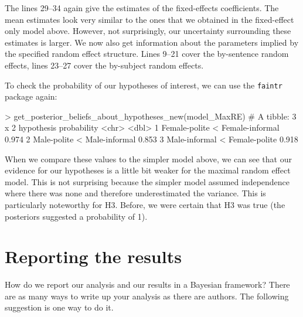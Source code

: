 \documentclass[nobib]{tufte-handout}
\begin{document}
The lines 29--34 again give the estimates of the fixed-effects coefficients. The mean estimates look very similar to the ones that we obtained in the fixed-effect only model above. However, not surprisingly, our uncertainty surrounding these estimates is larger.  
We now also get information about the parameters implied by the specified random effect
structure. Lines 9--21 cover the by-sentence random effects, lines 23--27 cover the by-subject
random effects.

To check the probability of our hypotheses of interest, we can use the \texttt{faintr} package again:

\medskip

\begin{minipage}[]{\textwidth}
\begin{rc}
> get_posterior_beliefs_about_hypotheses_new(model_MaxRE)
# A tibble: 3 x 2
  hypothesis                      probability
  <chr>                                 <dbl>
1 Female-polite < Female-informal       0.974
2 Male-polite < Male-informal           0.853
3 Male-informal < Female-polite         0.918
\end{rc}
\end{minipage}

When we compare these values to the simpler model above, we can see that our evidence for our hypotheses is a little bit weaker for the maximal random effect model. This is not surprising because the simpler model assumed independence where there was none and therefore underestimated the variance. This is particularly noteworthy for H3. Before, we were certain that H3 was true (the posteriors suggested a probability of 1).

\section{Reporting the results}
How do we report our analysis and our results in a Bayesian framework? There are as many ways to write up your analysis as there are authors. The following suggestion is one way to do it. 
\end{document}

